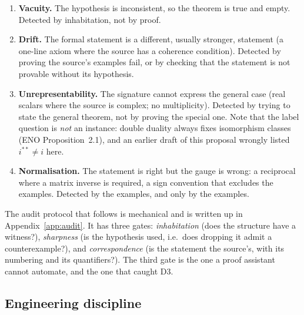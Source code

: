 \documentclass[11pt,a4paper]{article}
\theoremstyle{remark}
\begin{document}
\begin{enumerate}[label=\textbf{F\arabic*.},leftmargin=2.4em]
\item \textbf{Vacuity.} The hypothesis is inconsistent, so the theorem is true and empty. Detected
by inhabitation, not by proof.
\item \textbf{Drift.} The formal statement is a different, usually stronger, statement (a
one-line axiom where the source has a coherence condition). Detected by proving the source's
examples fail, or by checking that the statement is not provable without its hypothesis.
\item \textbf{Unrepresentability.} The signature cannot express the general case (real scalars
where the source is complex; no multiplicity). Detected by trying to state the general theorem,
not by proving the special one. Note that the label question is \emph{not} an instance: double
duality always fixes isomorphism classes (ENO Proposition~2.1), and an earlier draft of this
proposal wrongly listed $i^{**} \neq i$ here.
\item \textbf{Normalisation.} The statement is right but the gauge is wrong: a reciprocal where a
matrix inverse is required, a sign convention that excludes the examples. Detected by the
examples, and only by the examples.
\end{enumerate}

The audit protocol that follows is mechanical and is written up in Appendix~\ref{app:audit}. It
has three gates: \emph{inhabitation} (does the structure have a witness?), \emph{sharpness} (is
the hypothesis used, i.e.\ does dropping it admit a counterexample?), and \emph{correspondence}
(is the statement the source's, with its numbering and its quantifiers?). The third gate is the
one a proof assistant cannot automate, and the one that caught D3.

\subsection{Engineering discipline}
\end{document}
